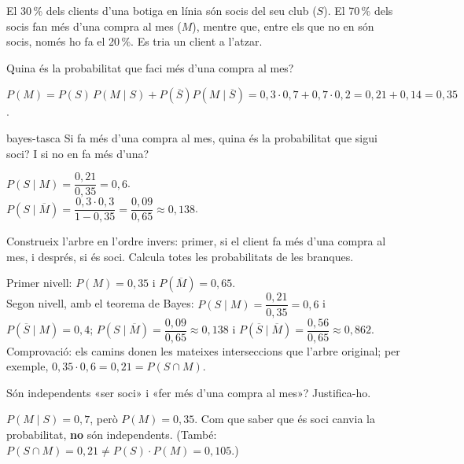 El 30\,\% dels clients d'una botiga en línia són socis del seu club ($S$). El 70\,\% dels socis fan més d'una
compra al mes ($M$), mentre que, entre els que no en són socis, només ho fa el 20\,\%. Es tria un client a
l'atzar.

\begin{apartats}

Quina és la probabilitat que faci més d'una compra al mes?

\begin{solucio}
$P(M)=P(S)\,P(M\mid S)+P\left(\overline{S}\right)P\left(M\mid\overline{S}\right)=0{,}3\cdot0{,}7+0{,}7\cdot0{,}2
=0{,}21+0{,}14=0{,}35$.
\end{solucio}

\begin{tria}{bayes-tasca}
Si fa més d'una compra al mes, quina és la probabilitat que sigui soci? I si no en fa més d'una?

\begin{solucio}
$P(S\mid M)=\dfrac{0{,}21}{0{,}35}=0{,}6$.\\
$P\left(S\mid\overline{M}\right)=\dfrac{0{,}3\cdot0{,}3}{1-0{,}35}=\dfrac{0{,}09}{0{,}65}\approx0{,}138$.
\end{solucio}

Construeix l'arbre en l'ordre invers: primer, si el client fa més d'una compra al mes, i després, si és
soci. Calcula totes les probabilitats de les branques.

\begin{solucio}
Primer nivell: $P(M)=0{,}35$ i $P\left(\overline{M}\right)=0{,}65$.\\
Segon nivell, amb el teorema de Bayes: $P(S\mid M)=\dfrac{0{,}21}{0{,}35}=0{,}6$ i
$P\left(\overline{S}\mid M\right)=0{,}4$; $P\left(S\mid\overline{M}\right)=\dfrac{0{,}09}{0{,}65}\approx0{,}138$
i $P\left(\overline{S}\mid\overline{M}\right)=\dfrac{0{,}56}{0{,}65}\approx0{,}862$.\\
Comprovació: els camins donen les mateixes interseccions que l'arbre original; per exemple,
$0{,}35\cdot0{,}6=0{,}21=P(S\cap M)$.
\end{solucio}
\end{tria}

\begin{nomesllarg}
Són independents «ser soci» i «fer més d'una compra al mes»? Justifica-ho.

\begin{solucio}
$P(M\mid S)=0{,}7$, però $P(M)=0{,}35$. Com que saber que és soci canvia la probabilitat, \textbf{no} són
independents. (També: $P(S\cap M)=0{,}21\neq P(S)\cdot P(M)=0{,}105$.)
\end{solucio}
\end{nomesllarg}

\end{apartats}
